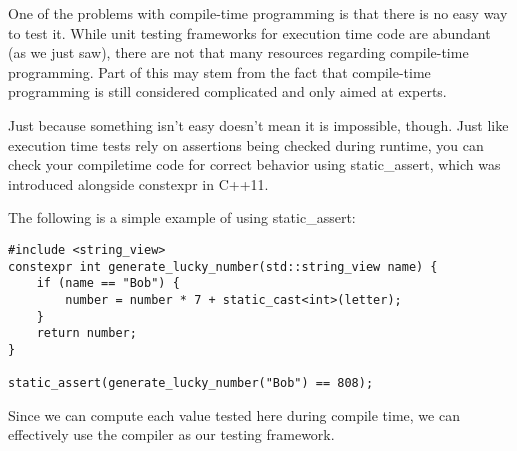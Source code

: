 One of the problems with compile-time programming is that there is no easy way to test it. While unit testing frameworks for execution time code are abundant (as we just saw), there are not that many resources regarding compile-time programming. Part of this may stem from the fact that compile-time programming is still considered complicated and only aimed at experts.

Just because something isn't easy doesn't mean it is impossible, though. Just like execution time tests rely on assertions being checked during runtime, you can check your compiletime code for correct behavior using static\_assert, which was introduced alongside constexpr in C++11.

The following is a simple example of using static\_assert:

\begin{lstlisting}[style=styleCXX]
#include <string_view>
constexpr int generate_lucky_number(std::string_view name) {
	if (name == "Bob") {
		number = number * 7 + static_cast<int>(letter);
	}
	return number;
}

static_assert(generate_lucky_number("Bob") == 808);
\end{lstlisting}

Since we can compute each value tested here during compile time, we can effectively use the compiler as our testing framework.











